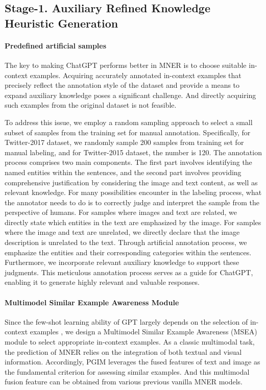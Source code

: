 \documentclass[11pt]{article}
\begin{document}
\subsection{Stage-1. Auxiliary Refined Knowledge Heuristic Generation}\label{sec:3.2}
\paragraph{Predefined artificial samples} 
The key to making ChatGPT performs better in MNER is to choose suitable in-context examples. 
Acquiring accurately annotated in-context examples that precisely reflect the annotation style of the dataset and provide a means to expand auxiliary knowledge poses a significant challenge. And directly acquiring such examples from the original dataset is not feasible. 

To address this issue, we employ a random sampling approach to select a small subset of samples from the training set for manual annotation. Specifically, for Twitter-2017 dataset, we randomly sample 200 samples from training set for manual labeling, and for Twitter-2015 dataset, the number is 120. The annotation process comprises two main components. The first part involves identifying the named entities within the sentences, and the second part involves providing comprehensive justification by considering the image and text content, as well as relevant knowledge. For many possibilities encounter in the labeling process, what the annotator needs to do is to correctly judge and interpret the sample from the perspective of humans. For samples where images and text are related, we directly state which entities in the text are emphasized by the image. For samples where the image and text are unrelated, we directly declare that the image description is unrelated to the text. Through artificial annotation process, we emphasize the entities and their corresponding categories within the sentences. Furthermore, we incorporate relevant auxiliary knowledge to support these judgments. This meticulous annotation process serves as a guide for ChatGPT, enabling it to generate highly relevant and valuable responses.

\paragraph{Multimodel Similar Example Awareness Module}
Since the few-shot learning ability of GPT largely depends on the selection of in-context examples \citep{liu2021makes,yang2022empirical}, we design a Multimodel Similar Example Awareness (MSEA) module to select appropriate in-context examples. As a classic multimodal task, the prediction of MNER relies on the integration of both textual and visual information. Accordingly, PGIM leverages the fused features of text and image as the fundamental criterion for assessing similar examples.
And this multimodal fusion feature can be obtained from various previous vanilla MNER models. 
\end{document}
